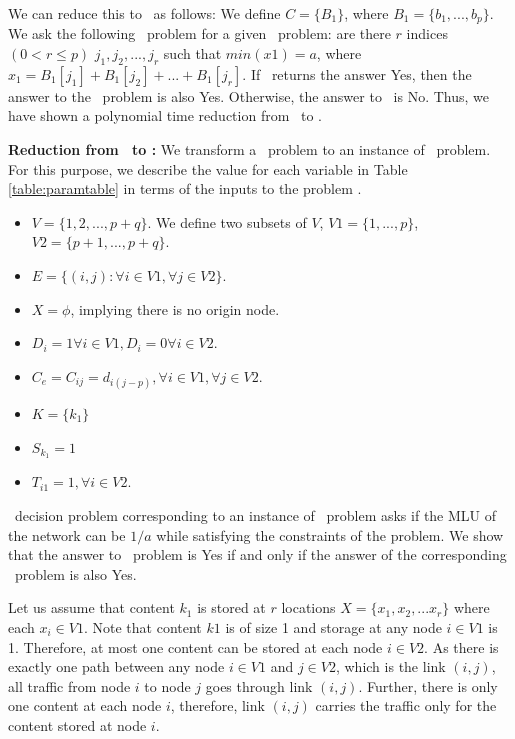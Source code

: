{We can reduce this to \minsubsetsum\ as follows: We define $C = \{B_1\}$, where $B_1 =  \{b_1, ..., b_p\}$.  We ask the following \minsubsetsum\ problem for a given \subsetsum\ problem: are there $r$ indices $(0 < r \leq p)$ $j_1, j_2, ..., j_r$ such that $\textit{min} (x1) = a$, where $ x_1 =  B_1[j_1] + B_1[j_2]  + ... + B_1[j_r]$.  If \minsubsetsum\ returns the answer Yes, then the answer to the \subsetsum\ problem is also Yes. Otherwise, the answer to \subsetsum\ is No. Thus, we have shown a polynomial time  reduction from \subsetsum\ to \minsubsetsum.

\vsp
\textbf{Reduction from \minsubsetsum\ to \optloc:}
We transform a  \minsubsetsum\ problem to an instance of \optloc\ problem. For this purpose, we describe the value for each variable in Table \ref{table:paramtable} in terms of the inputs to the problem \minsubsetsum. 
\begin{itemize}
\item $V = \{1, 2, ..., p + q\}$. We define two subsets of $V$,  $V1 = \{1, ..., p\}$, $V2 = \{p+1, ..., p + q\}$.
\item $E =  \{ (i, j) : \forall i \in V1, \forall j \in V2\}$.
\item $X = \phi$, implying there is no origin node.
\item $D_i = 1 \forall i \in V1, D_i = 0 \forall i \in V2$.
\item $C_e = C_{ij} = d_{i(j - p)}, \forall i \in V1, \forall j \in V2$.
\item $K = \{k_1\} $
\item $S_{k_1} = 1$
\item $T_{i1} = 1, \forall i \in V2$. 
\end{itemize}


\optloc\ decision problem corresponding to  an instance of \minsubsetsum\ problem asks if the MLU of the network can be $1/a$ while satisfying the constraints of the problem.  We show that the answer to \minsubsetsum\ problem is Yes if and only if the answer of the corresponding \optloc\ problem is also Yes. 


Let us assume that content $k_1$ is stored at $r$ locations $X =\{ x_{1}, x_{2}, ... x_{r} \}$ where each $x_{i} \in V1$.  Note that content $k1$ is of size 1 and storage at any node $i \in V1$ is 1. Therefore, at most one content can be stored at each node $i \in V2$. As there is exactly one path between any node $i \in V1$ and  $j \in V2$, which is the link $(i, j)$, all traffic from node $i$ to node $j$ goes through link $(i, j)$. Further, there is only one content at each node $i$, therefore, link $(i, j)$ carries the traffic only for the content stored at node $i$.

}
